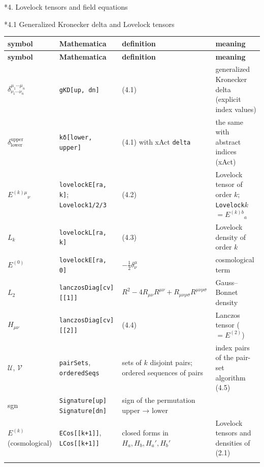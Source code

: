 \documentclass[10pt,a4paper]{article}
\makeatletter
\renewcommand\section{\@startsection{section}{1}{\z@}{-3.5ex \@plus -1ex \@minus -.2ex}{2.3ex \@plus.2ex}{\normalfont\Large\bfseries\raggedright}}
\renewcommand\subsection{\@startsection{subsection}{2}{\z@}{-3.25ex\@plus -1ex \@minus -.2ex}{1.5ex \@plus .2ex}{\normalfont\large\bfseries\raggedright}}
\makeatother
\begin{document}
\section*{4. Lovelock tensors and field equations}
\subsection*{4.1 Generalized Kronecker delta and Lovelock tensors}
{\small
\begin{longtable}{>{\raggedright\arraybackslash}p{}>{\raggedright\arraybackslash}p{}>{\raggedright\arraybackslash}p{}>{\raggedright\arraybackslash}p{}}
\toprule
\textbf{symbol} & \textbf{Mathematica} & \textbf{definition} & \textbf{meaning} \\
\midrule\endfirsthead
\toprule
\textbf{symbol} & \textbf{Mathematica} & \textbf{definition} & \textbf{meaning} \\
\midrule\endhead
\endfoot
\bottomrule\endlastfoot
$\delta^{\mu_1\cdots\mu_n}_{\nu_1\cdots\nu_n}$ & \texttt{gKD[up, dn]} & (4.1) & generalized Kronecker delta (explicit index values) \\
$\delta^{\text{upper}}_{\text{lower}}$ & \texttt{kδ[lower, upper]} & (4.1) with xAct \texttt{delta} & the same with abstract indices (xAct) \\
$E^{(k)\mu}{}_\nu$ & \texttt{lovelockE[ra, k]}; \texttt{Lovelock1/\allowbreak{}2/\allowbreak{}3} & (4.2) & Lovelock tensor of order $k$; \texttt{Lovelock}$k$ $=E^{(k)b}{}_a$ \\
$L_k$ & \texttt{lovelockL[ra, k]} & (4.3) & Lovelock density of order $k$ \\
$E^{(0)}$ & \texttt{lovelockE[ra, 0]} & $-\tfrac12\delta^\mu_\nu$ & cosmological term \\
$L_2$ & \texttt{lanczosDiag[cv][[1]]} & $R^2-4R_{\mu\nu}R^{\mu\nu}+R_{\mu\nu\rho\sigma}R^{\mu\nu\rho\sigma}$ & Gauss–Bonnet density \\
$H_{\mu\nu}$ & \texttt{lanczosDiag[cv][[2]]} & (4.4) & Lanczos tensor ($=E^{(2)}$) \\
$\mathcal U$, $\mathcal V$ & \texttt{pairSets}, \texttt{orderedSeqs} & sets of $k$ disjoint pairs; ordered sequences of pairs & index pairs of the pair-set algorithm (4.5) \\
sgn & \texttt{Signature[up] Signature[dn]} & sign of the permutation upper → lower &  \\
$E^{(k)}$ (cosmological) & \texttt{ECos[[k+1]]}, \texttt{LCos[[k+1]]} & closed forms in $H_a,H_b,H_a',H_b'$ & Lovelock tensors and densities of (2.1) \\*
\end{longtable}}
\end{document}
